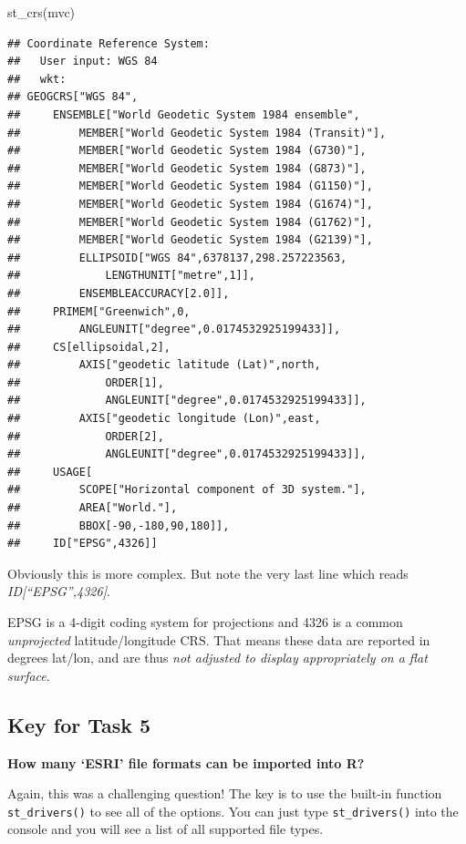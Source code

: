 \documentclass[
]{book}
\newenvironment{Shaded}{\begin{snugshade}}{\end{snugshade}}
\newcommand{\FunctionTok}[1]{\textcolor[rgb]{0.00,0.00,0.00}{#1}}
\newcommand{\NormalTok}[1]{#1}
\begin{document}
\begin{Shaded}
\begin{Highlighting}[]
\FunctionTok{st\_crs}\NormalTok{(mvc)}
\end{Highlighting}
\end{Shaded}

\begin{verbatim}
## Coordinate Reference System:
##   User input: WGS 84 
##   wkt:
## GEOGCRS["WGS 84",
##     ENSEMBLE["World Geodetic System 1984 ensemble",
##         MEMBER["World Geodetic System 1984 (Transit)"],
##         MEMBER["World Geodetic System 1984 (G730)"],
##         MEMBER["World Geodetic System 1984 (G873)"],
##         MEMBER["World Geodetic System 1984 (G1150)"],
##         MEMBER["World Geodetic System 1984 (G1674)"],
##         MEMBER["World Geodetic System 1984 (G1762)"],
##         MEMBER["World Geodetic System 1984 (G2139)"],
##         ELLIPSOID["WGS 84",6378137,298.257223563,
##             LENGTHUNIT["metre",1]],
##         ENSEMBLEACCURACY[2.0]],
##     PRIMEM["Greenwich",0,
##         ANGLEUNIT["degree",0.0174532925199433]],
##     CS[ellipsoidal,2],
##         AXIS["geodetic latitude (Lat)",north,
##             ORDER[1],
##             ANGLEUNIT["degree",0.0174532925199433]],
##         AXIS["geodetic longitude (Lon)",east,
##             ORDER[2],
##             ANGLEUNIT["degree",0.0174532925199433]],
##     USAGE[
##         SCOPE["Horizontal component of 3D system."],
##         AREA["World."],
##         BBOX[-90,-180,90,180]],
##     ID["EPSG",4326]]
\end{verbatim}

Obviously this is more complex. But note the very last line which reads \emph{ID{[}``EPSG'',4326{]}}.

EPSG is a 4-digit coding system for projections and 4326 is a common \emph{unprojected} latitude/longitude CRS. That means these data are reported in degrees lat/lon, and are thus \emph{not adjusted to display appropriately on a flat surface}.

\hypertarget{key-for-task-5-1}{%
\subsection{Key for Task 5}\label{key-for-task-5-1}}

\textbf{How many `ESRI' file formats can be imported into R?}

Again, this was a challenging question! The key is to use the built-in function \texttt{st\_drivers()} to see all of the options. You can just type \texttt{st\_drivers()} into the console and you will see a list of all supported file types.
\end{document}
